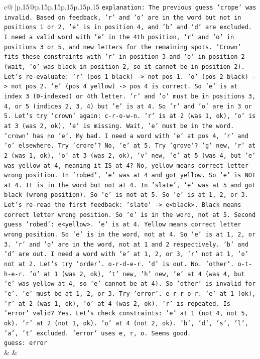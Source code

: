 \documentclass{article}
\begin{document}
{\begin{supertabular}{c@{$\;$}|p{.15\linewidth}@{}p{.15\linewidth}p{.15\linewidth}p{.15\linewidth}p{.15\linewidth}p{.15\linewidth}}
{{{                \texttt{explanation: The previous guess 'crope' was invalid. Based on feedback, 'r' and 'o' are in the word but not in positions 1 or 2, 'e' is in position 4, and 'b' and 'd' are excluded. I need a valid word with 'e' in the 4th position, 'r' and 'o' in positions 3 or 5, and new letters for the remaining spots. 'Crown' fits these constraints with 'r' in position 3 and 'o' in position 2 (wait, 'o' was black in position 2, so it cannot be in position 2). Let's re{-}evaluate: 'r' (pos 1 black) {-}> not pos 1. 'o' (pos 2 black) {-}> not pos 2. 'e' (pos 4 yellow) {-}> pos 4 is correct. So 'e' is at index 3 (0{-}indexed) or 4th letter. 'r' and 'o' must be in positions 3, 4, or 5 (indices 2, 3, 4) but 'e' is at 4. So 'r' and 'o' are in 3 or 5. Let's try 'crown' again: c{-}r{-}o{-}w{-}n. 'r' is at 2 (was 1, ok), 'o' is at 3 (was 2, ok), 'e' is missing. Wait, 'e' must be in the word. 'crown' has no 'e'. My bad. I need a word with 'e' at pos 4, 'r' and 'o' elsewhere. Try 'crore'? No, 'e' at 5. Try 'grove'? 'g' new, 'r' at 2 (was 1, ok), 'o' at 3 (was 2, ok), 'v' new, 'e' at 5 (was 4, but 'e' was yellow at 4, meaning it IS at 4? No, yellow means correct letter wrong position. In 'robed', 'e' was at 4 and got yellow. So 'e' is NOT at 4. It is in the word but not at 4. In 'slate', 'e' was at 5 and got black (wrong position). So 'e' is not at 5. So 'e' is at 1, 2, or 3. Let's re{-}read the first feedback: 'slate' {-}> e<black>. Black means correct letter wrong position. So 'e' is in the word, not at 5. Second guess 'robed': e<yellow>. 'e' is at 4. Yellow means correct letter wrong position. So 'e' is in the word, not at 4. So 'e' is at 1, 2, or 3. 'r' and 'o' are in the word, not at 1 and 2 respectively. 'b' and 'd' are out. I need a word with 'e' at 1, 2, or 3, 'r' not at 1, 'o' not at 2. Let's try 'order'. o{-}r{-}d{-}e{-}r. 'd' is out. No. 'other'. o{-}t{-}h{-}e{-}r. 'o' at 1 (was 2, ok), 't' new, 'h' new, 'e' at 4 (was 4, but 'e' was yellow at 4, so 'e' cannot be at 4). So 'other' is invalid for 'e'. 'e' must be at 1, 2, or 3. Try 'error'. e{-}r{-}r{-}o{-}r. 'e' at 1 (ok), 'r' at 2 (was 1, ok), 'o' at 4 (was 2, ok). 'r' is repeated. Is 'error' valid? Yes. Let's check constraints: 'e' at 1 (not 4, not 5, ok). 'r' at 2 (not 1, ok). 'o' at 4 (not 2, ok). 'b', 'd', 's', 'l', 'a', 't' excluded. 'error' uses e, r, o. Seems good.} \\
\texttt{guess: error} \\
            }
        }
    }
    & & \\ \\


\end{supertabular}}
\end{document}
